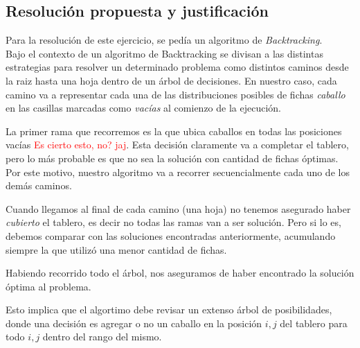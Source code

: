 \newpage

\subsection{Resoluci\'on propuesta y justificaci\'on}
Para la resoluci\'on de este ejercicio, se ped\'ia un algoritmo de \emph{Backtracking}.\\


Bajo el contexto de un algoritmo de Backtracking se divisan a las distintas estrategias para resolver un determinado problema como distintos caminos desde la raiz hasta una hoja dentro de un \'arbol de decisiones. En nuestro caso, cada camino va a representar cada una de las distribuciones posibles de fichas \emph{caballo} en las casillas marcadas como \emph{vac\'ias} al comienzo de la ejecuci\'on. 

La primer rama que recorremos es la que ubica caballos en todas las posiciones vac\'ias \textcolor{red}{Es cierto esto, no? jaj}. Esta decisi\'on claramente va a completar el tablero, pero lo m\'as probable es que no sea la soluci\'on con cantidad de fichas \'optimas. Por este motivo, nuestro algoritmo va a recorrer secuencialmente cada uno de los dem\'as caminos. 

Cuando llegamos al final de cada camino (una hoja) no tenemos asegurado haber \emph{cubierto} el tablero, es decir no todas las ramas van a ser soluci\'on. Pero si lo es, debemos comparar con las soluciones encontradas anteriormente, acumulando siempre la que utiliz\'o una menor cantidad de fichas.


Habiendo recorrido todo el \'arbol, nos aseguramos de haber encontrado la soluci\'on \'optima al problema.






Esto implica que el algortimo debe revisar un extenso \'arbol de posibilidades, donde una decisi\'on es agregar o no un caballo en la posici\'on $i, j$ del tablero para todo $i, j$ dentro del rango del mismo. \\

